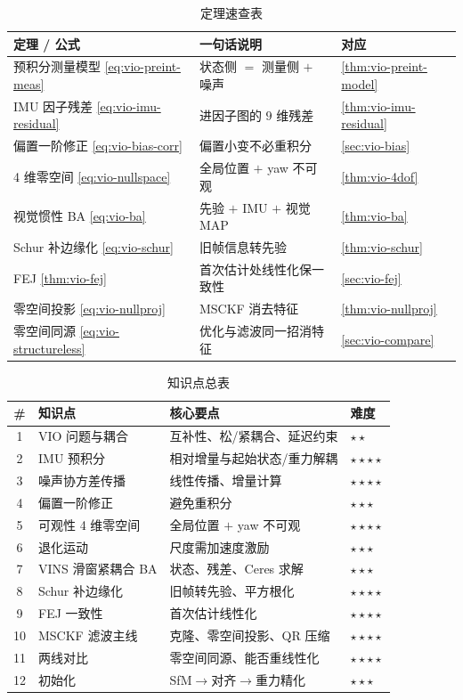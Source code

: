 \begin{table}[H]\centering\small
\caption{定理速查表}
\label{tab:vio-theorems}
\begin{tabular}{lll}
\toprule
定理 / 公式 & 一句话说明 & 对应 \\
\midrule
预积分测量模型 \cref{eq:vio-preint-meas} & 状态侧 $=$ 测量侧 $+$ 噪声 & \cref{thm:vio-preint-model} \\
IMU 因子残差 \cref{eq:vio-imu-residual} & 进因子图的 $9$ 维残差 & \cref{thm:vio-imu-residual} \\
偏置一阶修正 \cref{eq:vio-bias-corr} & 偏置小变不必重积分 & \cref{sec:vio-bias} \\
4 维零空间 \cref{eq:vio-nullspace} & 全局位置 $+$ yaw 不可观 & \cref{thm:vio-4dof} \\
视觉惯性 BA \cref{eq:vio-ba} & 先验 $+$ IMU $+$ 视觉 MAP & \cref{thm:vio-ba} \\
Schur 补边缘化 \cref{eq:vio-schur} & 旧帧信息转先验 & \cref{thm:vio-schur} \\
FEJ \cref{thm:vio-fej} & 首次估计处线性化保一致性 & \cref{sec:vio-fej} \\
零空间投影 \cref{eq:vio-nullproj} & MSCKF 消去特征 & \cref{thm:vio-nullproj} \\
零空间同源 \cref{eq:vio-structureless} & 优化与滤波同一招消特征 & \cref{sec:vio-compare} \\
\bottomrule
\end{tabular}
\end{table}

\begin{table}[H]\centering\small
\caption{知识点总表}
\label{tab:vio-knowledge}
\begin{tabular}{clll}
\toprule
\# & 知识点 & 核心要点 & 难度 \\
\midrule
1 & VIO 问题与耦合 & 互补性、松/紧耦合、延迟约束 & \(\star\star\) \\
2 & IMU 预积分 & 相对增量与起始状态/重力解耦 & \(\star\star\star\star\) \\
3 & 噪声协方差传播 & 线性传播、增量计算 & \(\star\star\star\star\) \\
4 & 偏置一阶修正 & 避免重积分 & \(\star\star\star\) \\
5 & 可观性 4 维零空间 & 全局位置 $+$ yaw 不可观 & \(\star\star\star\star\) \\
6 & 退化运动 & 尺度需加速度激励 & \(\star\star\star\) \\
7 & VINS 滑窗紧耦合 BA & 状态、残差、Ceres 求解 & \(\star\star\star\) \\
8 & Schur 补边缘化 & 旧帧转先验、平方根化 & \(\star\star\star\star\) \\
9 & FEJ 一致性 & 首次估计线性化 & \(\star\star\star\star\) \\
10 & MSCKF 滤波主线 & 克隆、零空间投影、QR 压缩 & \(\star\star\star\star\) \\
11 & 两线对比 & 零空间同源、能否重线性化 & \(\star\star\star\star\) \\
12 & 初始化 & SfM$\to$对齐$\to$重力精化 & \(\star\star\star\) \\
\bottomrule
\end{tabular}
\end{table}

